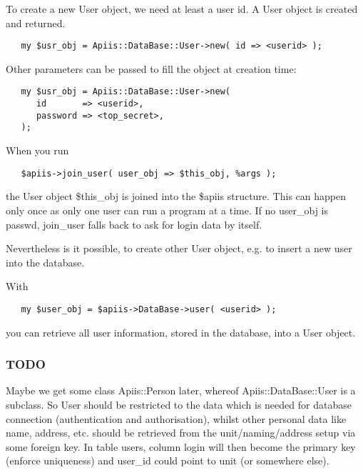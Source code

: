 To create a new User object, we need at least a user id.
A User object is created and returned.

\begin{verbatim}
   my $usr_obj = Apiis::DataBase::User->new( id => <userid> );
\end{verbatim}


Other parameters can be passed to fill the object at creation time:

\begin{verbatim}
   my $usr_obj = Apiis::DataBase::User->new(
      id       => <userid>,
      password => <top_secret>,
   );
\end{verbatim}


When you run

\begin{verbatim}
   $apiis->join_user( user_obj => $this_obj, %args );
\end{verbatim}


the User object \$this\_obj is joined into the \$apiis structure. This can happen
only once as only one user can run a program at a time. If no user\_obj is passwd,
join\_user falls back to ask for login data by itself.



Nevertheless is it possible, to create other User object, e.g. to insert a new 
user into the database.



With

\begin{verbatim}
   my $user_obj = $apiis->DataBase->user( <userid> );
\end{verbatim}


you can retrieve all user information, stored in the database, into a User object.

\subsubsection*{TODO\label{Apiis::DataBase::User_--_collecting_and_providing_user_data_TODO}}


Maybe we get some class Apiis::Person later, whereof Apiis::DataBase::User is a
subclass. So User should be restricted to the data which is needed for database
connection (authentication and authorisation), whilst other personal data like name,
address, etc. should be retrieved from the unit/naming/address setup via some foreign
key. In table users, column login will then become the primary key (enforce uniqueness)
and user\_id could point to unit (or somewhere else).

